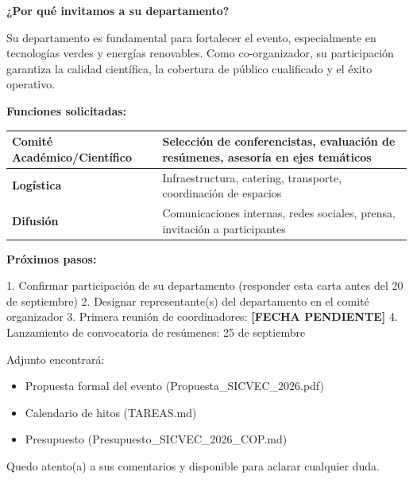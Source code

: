 \documentclass[12pt,a4paper]{article}
\begin{document}
\vspace{0.8cm}

\textbf{¿Por qué invitamos a su departamento?}

Su departamento es fundamental para fortalecer el evento, especialmente en tecnologías verdes y energías renovables. Como co-organizador, su participación garantiza la calidad científica, la cobertura de público cualificado y el éxito operativo.

\vspace{1cm}

\textbf{Funciones solicitadas:}

\begin{tabular}{|l|p{10cm}|}
\hline
\textbf{Comité Académico/Científico} & Selección de conferencistas, evaluación de resúmenes, asesoría en ejes temáticos \\
\hline
\textbf{Logística} & Infraestructura, catering, transporte, coordinación de espacios \\
\hline
\textbf{Difusión} & Comunicaciones internas, redes sociales, prensa, invitación a participantes \\
\hline
\end{tabular}

\vspace{1cm}

\textbf{Próximos pasos:}

1. Confirmar participación de su departamento (responder esta carta antes del 20 de septiembre)
2. Designar representante(s) del departamento en el comité organizador
3. Primera reunión de coordinadores: \textbf{[FECHA PENDIENTE]}
4. Lanzamiento de convocatoria de resúmenes: 25 de septiembre

\vspace{1cm}

Adjunto encontrará:
\begin{itemize}
  \item Propuesta formal del evento (Propuesta\_SICVEC\_2026.pdf)
  \item Calendario de hitos (TAREAS.md)
  \item Presupuesto (Presupuesto\_SICVEC\_2026\_COP.md)
\end{itemize}

\vspace{1cm}

Quedo atento(a) a sus comentarios y disponible para aclarar cualquier duda.

\vspace{1.5cm}
\end{document}
